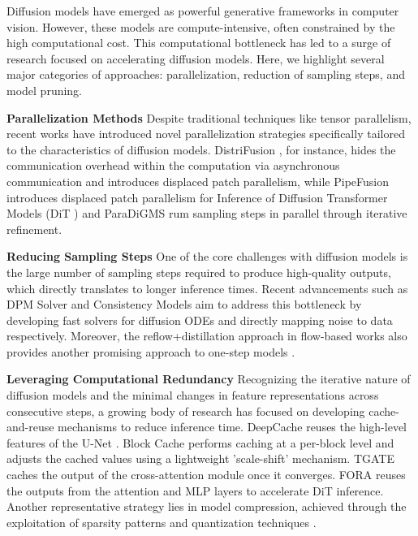\documentclass[10pt]{article}
\begin{document}
Diffusion models have emerged as powerful generative frameworks in computer vision. However, these models are compute-intensive, often constrained by the high computational cost. This computational bottleneck has led to a surge of research focused on accelerating diffusion models. Here, we highlight several major categories of approaches: parallelization, reduction of sampling steps, and model pruning.

\textbf{Parallelization Methods}
 Despite traditional techniques like tensor parallelism, recent works have introduced novel parallelization strategies specifically tailored to the characteristics of diffusion models. DistriFusion \citep{li2024distrifusiondistributedparallelinference}, for instance, hides the communication overhead within the computation via asynchronous communication and introduces displaced patch parallelism, while PipeFusion \citep{wang2024pipefusiondisplacedpatchpipeline} introduces displaced patch parallelism for Inference of Diffusion Transformer Models (DiT \citep{Peebles2022DiT}) and ParaDiGMS \citep{shih2023paradigms} rum sampling steps in parallel through iterative refinement.

\textbf{Reducing Sampling Steps}
One of the core challenges with diffusion models is the large number of sampling steps required to produce high-quality outputs, which directly translates to longer inference times. Recent advancements such as DPM Solver \citep{lu2022dpm,zheng2023dpmsolverv3improveddiffusionode} and Consistency Models \citep{song2023consistency,song2023improvedtechniquestrainingconsistency} aim to address this bottleneck by developing fast solvers for diffusion ODEs and directly mapping noise to data respectively.  Moreover, the reflow+distillation \citep{liu2022flowstraightfastlearning} approach in flow-based works \citep{lipman2022flow,tong2024improvinggeneralizingflowbasedgenerative} also provides another promising approach to one-step models \citep{liu2024instaflowstephighqualitydiffusionbased,yin2024one}.

\textbf{Leveraging Computational Redundancy} %
Recognizing the iterative nature of diffusion models and the minimal changes in feature representations across consecutive steps, a growing body of research has focused on developing cache-and-reuse mechanisms to reduce inference time. DeepCache \citep{ma2023deepcache} reuses the high-level features of the U-Net \citep{ronneberger2015unetconvolutionalnetworksbiomedical}. Block Cache \citep{wimbauer2023cache} performs caching at a per-block level and adjusts the cached values using a lightweight 'scale-shift' mechanism. TGATE \citep{liu2024faster,tgate} caches the output of the cross-attention module once it converges. FORA \citep{Selvaraju2024FORAFC} reuses the outputs from the attention and MLP layers to accelerate DiT inference. Another representative strategy lies in model compression, achieved through the exploitation of sparsity patterns \citep{NEURIPS2022_b9603de9,wang2024sparsedmsparseefficientdiffusion} and quantization techniques \citep{zhao2024viditqefficientaccuratequantization,fang2023structuralpruningdiffusionmodels,li2023qdiffusionquantizingdiffusionmodels}.
\end{document}
